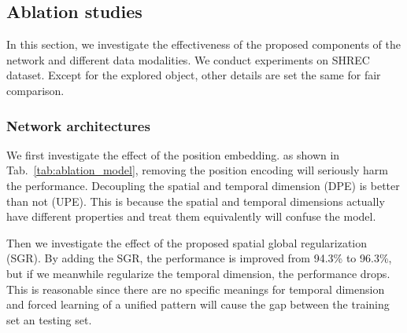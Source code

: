 \documentclass[runningheads]{llncs}
\begin{document}
\subsection{Ablation studies}
\label{sec:ablation}
In this section, we investigate the effectiveness of the proposed components of the network and different data modalities. 
We conduct experiments on SHREC dataset. 
Except for the explored object, other details are set the same for fair comparison. 

\subsubsection{Network architectures}
We first investigate the effect of the position embedding. 
as shown in Tab.~\ref{tab:ablation_model}, removing the position encoding will seriously harm the performance. Decoupling the spatial and temporal dimension (DPE) is better than not (UPE). 
This is because the spatial and temporal dimensions actually have different properties and treat them equivalently will confuse the model.

Then we investigate the effect of the proposed spatial global regularization (SGR). 
By adding the SGR, the performance is improved from 94.3\% to 96.3\%, but if we meanwhile regularize the temporal dimension, the performance drops. 
This is reasonable since there are no specific meanings for temporal dimension and forced learning of a unified pattern will cause the gap between the training set an testing set. 
\end{document}
